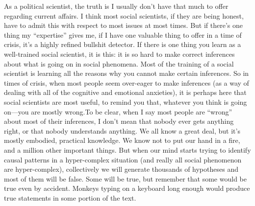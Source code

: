 \documentclass[a4paper,12pt,margin=.5in]{article}
\begin{document}
As a political scientist, the truth is I usually don't have that much to
offer regarding current affairs. I think most social scientists, if they
are being honest, have to admit this with respect to most issues at most
times. But if there's one thing my ``expertise'' gives me, if I have one
valuable thing to offer in a time of crisis, it's a highly refined
bullshit detector. If there is one thing you learn as a well-trained
social scientist, it is this: it is so hard to make correct inferences
about what is going on in social phenomena. Most of the training of a
social scientist is learning all the reasons why you cannot make certain
inferences. So in times of crisis, when most people seem over-eager to
make inferences (as a way of dealing with all of the cognitive and
emotional anxieties), it is perhaps here that social scientists are most
useful, to remind you that, whatever you think is going on---you are
mostly wrong.To be clear, when I say most people are ``wrong'' about
most of their inferences, I don't mean that nobody ever gets anything
right, or that nobody understands anything. We all know a great deal,
but it's mostly embodied, practical knowledge. We know not to put our
hand in a fire, and a million other important things. But when our mind
starts trying to identify causal patterns in a hyper-complex situation
(and really all social phenomenon are hyper-complex), collectively we
will generate thousands of hypotheses and most of them will be false.
Some will be true, but remember that some would be true even by
accident. Monkeys typing on a keyboard long enough would produce true
statements in some portion of the text.
\end{document}
